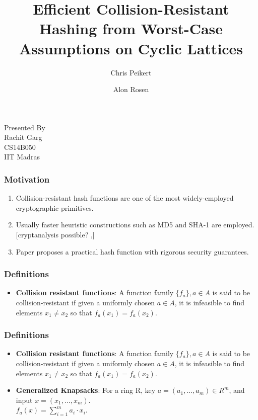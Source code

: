 \documentclass{beamer}
\title[Cyclic CRH Functions]{Efficient Collision-Resistant Hashing from Worst-Case Assumptions on Cyclic Lattices} %
\author{
Chris Peikert
\and
Alon Rosen
}
\date{ } %
\begin{document}
\begin{frame}
\titlepage %
\centering
{\footnotesize Presented By \\ \footnotesize Rachit Garg \\ \scriptsize CS14B050 \\ \scriptsize IIT Madras}
\end{frame}


\begin{frame}
\frametitle{Motivation}
\begin{enumerate}
\item Collision-resistant hash functions
are one of the most widely-employed cryptographic primitives.
\item Usually faster heuristic constructions such as MD5 and SHA-1 are employed. [cryptanalysis possible? \cite{Wang:2005:FCF:2153419.2153421},\cite{Wang:2005:BMO:2154598.2154601}]
\item Paper proposes a practical hash function with rigorous security guarantees.
\end{enumerate}
\end{frame}


\begin{frame}
\frametitle{Definitions}
\begin{itemize}
\item \textbf{Collision resistant functions}: A function family $\{f_a\}, a \in A$ is said to be collision-resistant if given a uniformly chosen $a \in A$, it is infeasible to find elements $x_1 \neq x_2$ so that $f_a(x_1) = f_a(x_2)$.
\end{itemize}
\end{frame}

\begin{frame}
	\frametitle{Definitions}
	\begin{itemize}
		\item \textbf{Collision resistant functions}: A function family $\{f_a\}, a \in A$ is said to be collision-resistant if given a uniformly chosen $a \in A$, it is infeasible to find elements $x_1 \neq x_2$ so that $f_a(x_1) = f_a(x_2)$.
		\item \textbf{Generalized Knapsacks}: For a ring R, key $a = (a_1 , . . . , a_m) \in R^m$, and input $x = (x_1 , . . . , x_m)$.
		\\
		$f_a(x) = \sum_{i=1}^{m}a_i·x_i$. 
	\end{itemize}
\end{frame}
\end{document}
